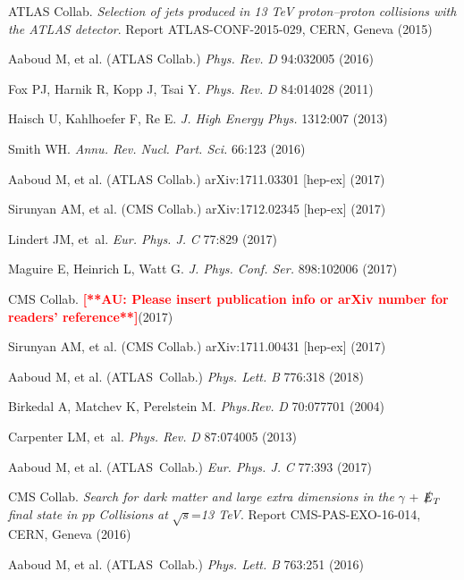 \documentclass{ar-1col}
\newcommand{\MET}{\ensuremath{\slashed{E}_T}\xspace}
\begin{document}
\begin{thebibliography}{175}
ATLAS Collab. \textit{Selection of jets produced in 13 TeV proton--proton collisions with the ATLAS detector}.
Report ATLAS-CONF-2015-029, CERN, Geneva (2015)

Aaboud M, et al. ({ATLAS Collab}.) \textit{Phys. Rev.} \textit{D} 94:032005 (2016)

Fox PJ, Harnik R, Kopp J, Tsai Y. \textit{Phys. Rev.} \textit{D} 84:014028
(2011)

Haisch U, Kahlhoefer F, Re E. \textit{J. High Energy Phys.} 1312:007 (2013)

Smith WH. \textit{Annu. Rev. Nucl. Part. Sci.} 66:123 (2016)

Aaboud M, et al. ({ATLAS Collab}.) arXiv:1711.03301 [hep-ex] (2017)

Sirunyan AM, et al. ({CMS Collab}.) arXiv:1712.02345 [hep-ex] (2017)

Lindert JM, et~al. \textit{Eur. Phys. J.} \textit{C} 77:829 (2017)

Maguire E, Heinrich L, Watt G. \textit{J. Phys. Conf. Ser.}
898:102006 (2017)

{CMS Collab}. \textbf{\textcolor{red}{[**AU: Please insert publication info or arXiv number for readers' reference**]}}(2017)

Sirunyan AM, et al. ({CMS Collab}.) arXiv:1711.00431 [hep-ex] (2017)

Aaboud M, et al. ({ATLAS~Collab}.) \textit{Phys. Lett.} \textit{B} 776:318 (2018)

Birkedal A, Matchev K, Perelstein M. \textit{Phys.Rev.} \textit{D} 70:077701
(2004)

Carpenter LM, et~al. \textit{Phys. Rev.} \textit{D} 87:074005 (2013)

Aaboud M, et al. ({ATLAS~Collab}.) \textit{Eur. Phys. J.} \textit{C} 77:393 (2017)

CMS Collab. \textit{Search for dark matter and large extra dimensions in the} $\gamma$ + \MET \textit{final state in pp Collisions at} $\sqrt{s}$=\textit{13 TeV}. Report CMS-PAS-EXO-16-014, CERN, Geneva (2016)

Aaboud M, et al. ({ATLAS~Collab}.) \textit{Phys. Lett.} \textit{B} 763:251 (2016)


\end{thebibliography}
\end{document}
